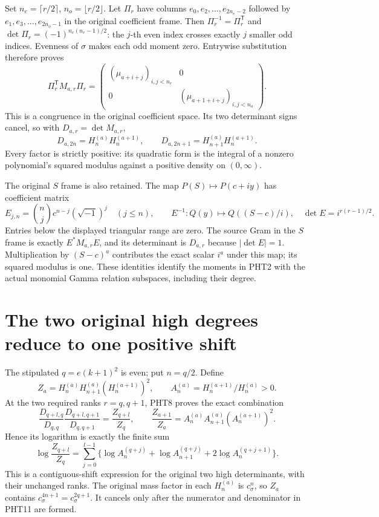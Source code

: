 \documentclass[11pt,a4paper]{article}
\begin{document}
Set $n_e=\lceil r/2\rceil$, $n_o=\lfloor r/2\rfloor$.
Let $\Pi_r$ have columns $e_0,e_2,\ldots,e_{2n_e-2}$ followed
by $e_1,e_3,\ldots,e_{2n_o-1}$ in the original coefficient
frame. Then $\Pi_r^{-1}=\Pi_r^{\mathsf T}$ and
$\det\Pi_r=(-1)^{n_e(n_e-1)/2}$: the $j$-th even index crosses
exactly $j$ smaller odd indices. Evenness of $\sigma$ makes
each odd moment zero. Entrywise substitution therefore proves
\[
 \Pi_r^{\mathsf T}M_{a,r}\Pi_r
 =\begin{pmatrix}
  (\mu_{a+i+j})_{i,j<n_e}&0\\
  0&(\mu_{a+1+i+j})_{i,j<n_o}
 \end{pmatrix}.
\tag{PHT7}
\]
This is a congruence in the original coefficient space. Its
two determinant signs cancel, so with $D_{a,r}=\det M_{a,r}$,
\[
 D_{a,2n}=H_n^{(a)}H_n^{(a+1)},\qquad
 D_{a,2n+1}=H_{n+1}^{(a)}H_n^{(a+1)}.
\tag{PHT8}
\]
Every factor is strictly positive: its quadratic form is
the integral of a nonzero polynomial's squared modulus
against a positive density on $(0,\infty)$.

The original $S$ frame is also retained. The map
$P(S)\mapsto P(c+iy)$ has coefficient matrix
\[
 E_{j,n}=\binom nj c^{n-j}(\sqrt{-1})^j\quad(j\leq n),\qquad
 E^{-1}:Q(y)\mapsto Q((S-c)/i),
 \quad\det E=i^{r(r-1)/2}.
\tag{PHT9}
\]
Entries below the displayed triangular range are zero.
The source Gram in the $S$ frame is exactly $E^*M_{a,r}E$,
and its determinant is $D_{a,r}$ because $|\det E|=1$.
Multiplication by $(S-c)^a$ contributes the exact scalar
$i^a$ under this map; its squared modulus is one. These
identities identify the moments in PHT2 with the actual
monomial Gamma relation subspaces, including their degree.

\section{The two original high degrees reduce to one positive shift}

The stipulated $q=e(k+1)^2$ is even; put $n=q/2$. Define
\[
 Z_a=H_n^{(a)}H_{n+1}^{(a)}(H_n^{(a+1)})^2,
 \qquad A_n^{(a)}=H_n^{(a+1)}/H_n^{(a)}>0.
\tag{PHT10}
\]
At the two required ranks $r=q,q+1$, PHT8 proves the exact
combination
\[
 \frac{D_{q+l,q}}{D_{q,q}}
 \frac{D_{q+l,q+1}}{D_{q,q+1}}
 =\frac{Z_{q+l}}{Z_q},\qquad
 \frac{Z_{a+1}}{Z_a}
 =A_n^{(a)}A_{n+1}^{(a)}(A_n^{(a+1)})^2.
\tag{PHT11}
\]
Hence its logarithm is exactly the finite sum
\[
 \log\frac{Z_{q+l}}{Z_q}
 =\sum_{j=0}^{l-1}
  \{\log A_n^{(q+j)}+\log A_{n+1}^{(q+j)}
                              +2\log A_n^{(q+j+1)}\}.
\tag{PHT12}
\]
This is a contiguous-shift expression for the original two
high determinants, with their unchanged ranks. The original
mass factor in each $H_n^{(a)}$ is $c_\sigma^n$, so $Z_a$
contains $c_\sigma^{4n+1}=c_\sigma^{2q+1}$. It cancels only
after the numerator and denominator in PHT11 are formed.
\end{document}
